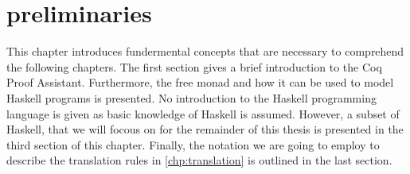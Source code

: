 \chapter{preliminaries} \label{chp:preliminaries}
This chapter introduces fundermental concepts that are necessary to comprehend the following chapters.
The first section gives a brief introduction to the Coq Proof Assistant.
Furthermore, the free monad and how it can be used to model Haskell programs is presented.
No introduction to the Haskell programming language is given as basic knowledge of Haskell is assumed.
However, a subset of Haskell, that we will focous on for the remainder of this thesis is presented in the third section of this chapter.
Finally, the notation we are going to employ to describe the translation rules in \autoref{chp:translation} is outlined in the last section.





